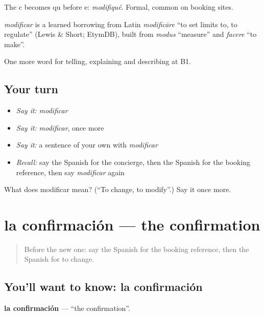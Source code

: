 The c becomes qu before e: \emph{modifiqué}. Formal, common on booking sites.

\begin{cousinweb}
\emph{modificar} is a learned borrowing from Latin \emph{modificāre} \textquotedblleft{}to set limits to, to regulate\textquotedblright{} (Lewis \& Short; EtymDB), built from \emph{modus} \textquotedblleft{}measure\textquotedblright{} and \emph{facere} \textquotedblleft{}to make\textquotedblright{}.
\end{cousinweb}

\begin{grammarlens}[title={What you've built}]
One more word for telling, explaining and describing at B1.
\end{grammarlens}

\subsection*{Your turn}
\begin{itemize}
\raggedright
  \item \emph{Say it:} \emph{modificar}
  \item \emph{Say it:} \emph{modificar}, once more
  \item \emph{Say it:} a sentence of your own with \emph{modificar}
  \item \emph{Recall:} say the Spanish for the concierge, then the Spanish for the booking reference, then say \emph{modificar} again
\end{itemize}

\begin{tcolorbox}[breakable,colback=teal!4,colframe=teal!35!black,title={Before you move on}]
What does modificar mean? (\textquotedblleft{}To change, to modify\textquotedblright{}.) Say it once more.
\end{tcolorbox}
\section[la confirmación]{la confirmación — the confirmation}

\label{lesson:ES-C662-confirmacion}



\begin{quote}
Before the new one: say the Spanish for the booking reference, then the Spanish for to change.
\end{quote}

\subsection*{You'll want to know: la confirmación}
\textbf{la confirmación} — \textquotedblleft{}the confirmation\textquotedblright{}.

